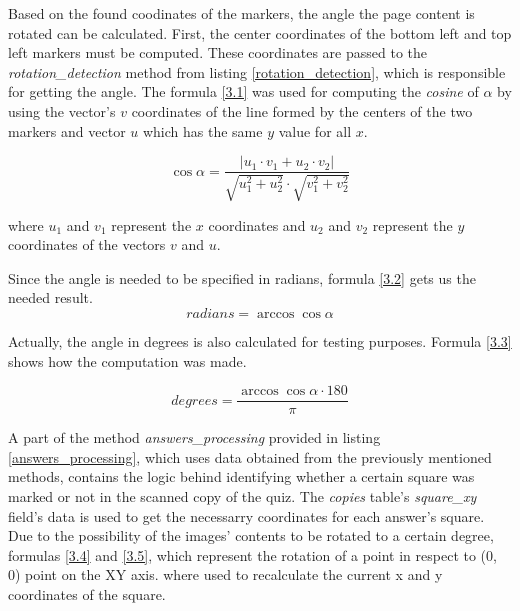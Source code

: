 

Based on the found coodinates of the markers, the angle the page content is rotated can be calculated. First, the center coordinates of the bottom left and top left markers must be computed. These coordinates are passed to the \textit{rotation\_detection} method from listing \ref{rotation_detection}, which is responsible for getting the angle. The formula \ref{3.1} was used for computing the \textit{cosine} of $\alpha$ by using the vector's $v$ coordinates of the line formed by the centers of the two markers and vector $u$ which has the same $y$ value for all $x$.

\begin{equation}
\cos \alpha = \frac{\left\vert u_{1} \cdot v_{1} + u_{2} \cdot v_{2} \right\vert }{\sqrt{u_{1}^{2}+u_{2}^{2}} \cdot \sqrt{v_{1}^{2}+v_{2}^{2}}}  \label{3.1}
\end{equation}

where $u_{1}$ and $v_{1}$ represent the $x$ coordinates and $u_{2}$ and $v_{2}$ represent the $y$ coordinates of the vectors $v$ and $u$.

Since the angle is needed to be specified in radians, formula \ref{3.2} gets us the needed result.
\begin{equation}
radians = \arccos{\cos \alpha} \label{3.2}
\end{equation}

Actually, the angle in degrees is also calculated for testing purposes. Formula \ref{3.3} shows how the computation was made.

\begin{equation}
degrees = \frac{\arccos \cos \alpha \cdot 180}{\pi} \label{3.3}
\end{equation}




A part of the method \textit{answers\_processing} provided in listing \ref{answers_processing}, which uses data obtained from the previously mentioned methods, contains the logic behind identifying whether a certain square was marked or not in the scanned copy of the quiz. The \textit{copies} table's \textit{square\_xy} field's data is used to get the necessarry coordinates for each answer's square. Due to the possibility of the images' contents to be rotated to a certain degree, formulas \ref{3.4} and \ref{3.5}, which represent the rotation of a point in respect to (0, 0) point on the XY axis. where used to recalculate the current x and y coordinates of the square. 

